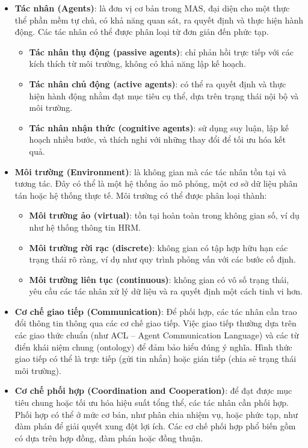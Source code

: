 \documentclass{article}
\begin{document}
\begin{itemize}[topsep=0pt, itemsep=2pt, leftmargin=40pt]
    \item \textbf{Tác nhân (Agents)}: là đơn vị cơ bản trong MAS, đại diện cho một thực thể phần mềm tự chủ, có khả năng quan sát, ra quyết định và thực hiện hành động. Các tác nhân có thể được phân loại từ đơn giản đến phức tạp.
    \begin{itemize}
        \item \textbf{Tác nhân thụ động (passive agents)}: chỉ phản hồi trực tiếp với các kích thích từ môi trường, không có khả năng lập
        kế hoạch.
        \item \textbf{Tác nhân chủ động (active agents)}: có thể ra quyết định và thực hiện hành động nhằm đạt mục tiêu cụ thể, dựa trên trạng thái nội bộ và môi trường.
        \item \textbf{Tác nhân nhận thức (cognitive agents)}: sử dụng suy luận, lập kế hoạch nhiều bước, và thích nghi với những thay đổi để tối ưu hóa kết quả.
    \end{itemize}
    \item \textbf{Môi trường (Environment)}: là không gian mà các tác nhân tồn tại và tương tác. Đây có thể là một hệ thống ảo mô phỏng, một cơ sở dữ liệu phân tán hoặc hệ thống thực tế. Môi trường có thể được phân loại thành:
    \begin{itemize}
        \item \textbf{Môi trường ảo (virtual)}: tồn tại hoàn toàn trong không gian số, ví dụ như hệ thống thông tin HRM.
        \item \textbf{Môi trường rời rạc (discrete)}: không gian có tập hợp hữu hạn các trạng thái rõ ràng, ví dụ như quy trình phỏng vấn với các bước cố định.
        \item \textbf{Môi trường liên tục (continuous)}: không gian có vô số trạng thái, yêu cầu các tác nhân xử lý dữ liệu và ra quyết định một cách tinh vi hơn.
    \end{itemize}
    \item \textbf{Cơ chế giao tiếp (Communication)}: Để phối hợp, các tác nhân cần trao đổi thông tin thông qua các cơ chế giao tiếp. Việc giao tiếp thường dựa trên các giao thức chuẩn (như ACL – Agent Communication Language) và các từ điển khái niệm chung (ontology) để đảm bảo hiểu đúng ý nghĩa. Hình thức giao tiếp có thể là trực tiếp (gửi tin nhắn) hoặc gián tiếp (chia sẻ trạng thái môi trường).
    \item \textbf{Cơ chế phối hợp (Coordination and Cooperation)}: để đạt được mục tiêu chung hoặc tối ưu hóa hiệu suất tổng thể, các tác nhân cần phối hợp. Phối hợp có thể ở mức cơ bản, như phân chia nhiệm vụ, hoặc phức tạp, như đàm phán để giải quyết xung đột lợi ích. Các cơ chế phối hợp phổ biến gồm có dựa trên hợp đồng, đàm phán hoặc đồng thuận.
\end{itemize}
\end{document}
